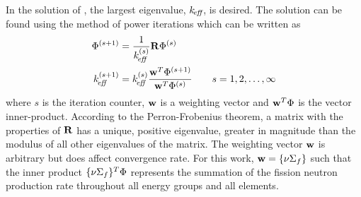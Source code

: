     In the solution of , the largest eigenvalue,
    $k_{\!\mbox{\scriptsize \em eff}}$, is desired. The solution can be found using the method of power
    iterations which can be written as 
    \begin{align}
      \label{eq:power_iteration_phi}
      \Phi^{(s+1)} &= \frac{1}{k_{\!\mbox{\scriptsize \em eff}}^{(s)}} \mathbf{R} \Phi^{(s)} \\
      \label{eq:power_iteration_eigenvalue}
      k_{\!\mbox{\scriptsize \em eff}}^{(s+1)} &= k_{\!\mbox{\scriptsize \em eff}}^{(s)} \frac{\mathbf{w}^{T} \Phi^{(s+1)}}
        {\mathbf{w}^{T} \Phi^{(s)}} \qquad s = 1,2,\ldots,\infty
    \end{align}
    where $s$ is the iteration counter, $\mathbf{w}$ is a weighting vector and 
    $\mathbf{w}^{T} \Phi$ is the vector inner-product. According to the 
    Perron-Frobenius theorem, a matrix with the properties of $\mathbf{R}$ has a 
    unique, positive eigenvalue, greater in magnitude than the modulus of all 
    other eigenvalues of the matrix. The weighting vector $\mathbf{w}$ is arbitrary 
    but does affect convergence rate. For this work,
    $\mathbf{w} = \{\nu \Sigma_f\}$ such that the inner product 
    $\{\nu \Sigma_f\}^T \Phi$ represents the summation of the fission neutron
    production rate throughout all energy groups and all elements. 
    
